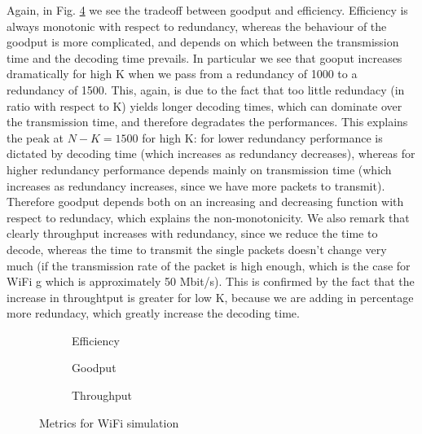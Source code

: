 Again, in Fig. \ref{fig:wifi} we see the tradeoff between goodput and efficiency. Efficiency is always monotonic with respect to redundancy, whereas the behaviour of the goodput is more complicated, and depends on which between the transmission time and the decoding time prevails. In particular we see that gooput increases dramatically for high K when we pass from a redundancy of 1000 to a redundancy of 1500. This, again, is due to the fact that too little redundacy (in ratio with respect to K) yields longer decoding times, which can dominate over the transmission time, and therefore degradates the performances. This explains the peak at $N-K=1500$ for high K: for lower redundancy performance is dictated by decoding time (which increases as redundancy decreases), whereas for higher redundancy performance depends mainly on transmission time (which increases as redundancy increases, since we have more packets to transmit). Therefore goodput depends both on an increasing and decreasing function with respect to redundacy, which explains the non-monotonicity.  We also remark that clearly throughput increases with redundancy, since we reduce the time to decode, whereas the time to transmit the single packets doesn't change very much (if the transmission rate of the packet is high enough, which is the case for WiFi g which is approximately 50 Mbit/s). This is confirmed by the fact that the increase in throughtput is greater for low K, because we are adding in percentage more redundacy, which greatly increase the decoding time. 
\begin{figure}[t]
\centering
\begin{subfigure}{0.23\textwidth}
	\captionsetup{justification=centering,font=scriptsize}
	\centering
	\setlength\fwidth{\textwidth}
	\setlength{}
	
	\caption{Efficiency}
	\label{fig:wifi_eff}
\end{subfigure}\hspace{2em}%
\begin{subfigure}{0.23\textwidth}
	\captionsetup{justification=centering,font=scriptsize}
	\centering
	\setlength\fwidth{\textwidth}
	\setlength{}
	
	\caption{Goodput}
	\label{fig:wifi_good}
\end{subfigure}\hspace{2em}%
\begin{subfigure}{0.23\textwidth}
	\captionsetup{justification=centering,font=scriptsize}
	\centering
	\setlength\fwidth{\textwidth}
	\setlength{}
	
	\caption{Throughput}
	\label{fig:wifi_thr}
\end{subfigure}
\caption{Metrics for WiFi simulation}
\label{fig:wifi}
\end{figure}
